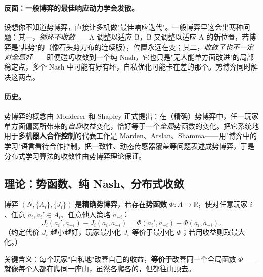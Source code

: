 \paragraph{反面：一般博弈的最佳响应动力学会发散。}
设想你不知道势博弈，直接让多机做"最佳响应迭代"。一般博弈里这会出两种问题：其一，\emph{循环不收敛}——A 调整以适应 B，B 又调整以适应 A 的新位置，若博弈是"非势"的（像石头剪刀布的连续版），位置永远在变；其二，\emph{收敛了也不一定对全局好}——即便碰巧收敛到一个纯 Nash，它也只是"无人能单方面改进"的局部稳定点，多个 Nash 中可能有好有坏，自私优化可能卡在差的那个。势博弈同时解决这两点。

\paragraph{历史。}
势博弈的概念由 Monderer 和 Shapley 正式提出\cite{monderer1996potential}：在（精确）势博弈中，任一玩家单方面偏离所带来的\emph{自身}收益变化，恰好等于一个\emph{全局}势函数的变化。把它系统地用于\textbf{多机器人合作控制}的代表工作是 Marden、Arslan、Shamma\cite{marden2009cooperative}——用"博弈中的学习"语言看待合作控制，把一致性、动态传感器覆盖等问题表述成势博弈，于是分布式学习算法的收敛性由势博弈理论保证。

\subsection{理论：势函数、纯 Nash、分布式收敛}

\begin{definition}[精确势博弈]\label{def:sm-potential}
博弈 $(N,\{A_i\},\{J_i\})$ 是\textbf{精确势博弈}，若存在\textbf{势函数} $\Phi:A\to\mathbb{R}$，使对任意玩家 $i$、任意 $a_i,a_i'\in A_i$、任意他人策略 $a_{-i}$：
\begin{equation}
  J_i(a_i',a_{-i})-J_i(a_i,a_{-i})=\Phi(a_i',a_{-i})-\Phi(a_i,a_{-i}).
  \label{eq:sm-potential-def}
\end{equation}
（约定代价 $J_i$ 越小越好，玩家最小化 $J_i$ 等价于最小化 $\Phi$；若用收益则取最大化。）
\end{definition}

关键含义：每个玩家"自私地"改善自己的收益，\textbf{等价于}改善同一个全局函数 $\Phi$——就像每个人都在爬同一座山，虽然各爬各的，但都往山顶去。

